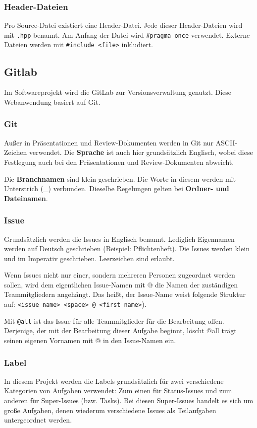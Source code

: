 \documentclass[../review_3.tex]{subfiles}
\begin{document}
\subsubsection{Header-Dateien}
Pro Source-Datei existiert eine Header-Datei. Jede dieser Header-Dateien wird mit \texttt{.hpp} benannt. Am Anfang der Datei wird \texttt{\#pragma once} verwendet. Externe Dateien werden mit \texttt{\#include <file>} inkludiert.

\subsection{Gitlab}
Im Softwareprojekt wird die GitLab zur Versionsverwaltung genutzt. Diese Webanwendung basiert auf Git.

\subsubsection{Git}
Außer in Präsentationen und Review-Dokumenten werden in Git nur ASCII-Zeichen verwendet. Die \textbf{Sprache} ist auch hier grundsätzlich Englisch, wobei diese Festlegung auch bei den Präsentationen und Review-Dokumenten abweicht.

Die \textbf{Branchnamen} sind klein geschrieben. Die Worte in diesem werden mit Unterstrich (\glqq \_\grqq{}) verbunden. Dieselbe Regelungen gelten bei \textbf{Ordner- und Dateinamen}.

\subsubsection{Issue}
Grundsätzlich werden die Issues in Englisch benannt. Lediglich \glqq Eigennamen\grqq{} werden auf Deutsch geschrieben (Beispiel: Pflichtenheft).
Die Issues werden klein und im Imperativ geschrieben. Leerzeichen sind erlaubt.

Wenn Issues nicht nur einer, sondern mehreren Personen zugeordnet werden sollen, wird dem eigentlichen Issue-Namen mit \glqq @\grqq{} die Namen der zuständigen Teammitgliedern angehängt. Das heißt, der Issue-Name weist folgende Struktur auf: \texttt{<issue name> <space> @ <first name>}).

Mit \texttt{@all} ist das Issue für alle Teammitglieder für die Bearbeitung offen. Derjenige, der mit der Bearbeitung dieser Aufgabe beginnt, löscht \glqq @all\grqq{} trägt seinen eigenen Vornamen mit \glqq @\grqq{} in den Issue-Namen ein.

\subsubsection{Label}
In diesem Projekt werden die Labels grundsätzlich für zwei verschiedene Kategorien von Aufgaben verwendet: Zum einen für Status-Issues und zum anderen für Super-Issues (bzw. Tasks). Bei diesen Super-Issues handelt es sich um große Aufgaben, denen wiederum verschiedene Issues als Teilaufgaben untergeordnet werden.
\end{document}
